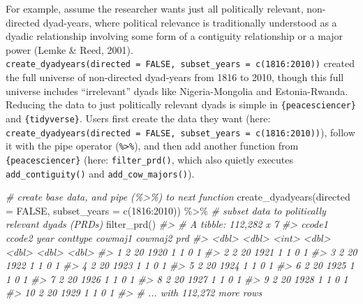 \documentclass[
  11pt,
]{article}
\newenvironment{Shaded}{\begin{snugshade}}{\end{snugshade}}
\newcommand{\AttributeTok}[1]{\textcolor[rgb]{0.77,0.63,0.00}{#1}}
\newcommand{\CommentTok}[1]{\textcolor[rgb]{0.56,0.35,0.01}{\textit{#1}}}
\newcommand{\ConstantTok}[1]{\textcolor[rgb]{0.00,0.00,0.00}{#1}}
\newcommand{\DecValTok}[1]{\textcolor[rgb]{0.00,0.00,0.81}{#1}}
\newcommand{\FunctionTok}[1]{\textcolor[rgb]{0.00,0.00,0.00}{#1}}
\newcommand{\NormalTok}[1]{#1}
\newcommand{\SpecialCharTok}[1]{\textcolor[rgb]{0.00,0.00,0.00}{#1}}
\begin{document}
For example, assume the researcher wants just all politically relevant, non-directed dyad-years, where political relevance is traditionally understood as a dyadic relationship involving some form of a contiguity relationship or a major power (Lemke \& Reed, 2001). \texttt{create\_dyadyears(directed\ =\ FALSE,\ subset\_years\ =\ c(1816:2010))} created the full universe of non-directed dyad-years from 1816 to 2010, though this full universe includes ``irrelevant'' dyads like Nigeria-Mongolia and Estonia-Rwanda. Reducing the data to just politically relevant dyads is simple in \texttt{\{peacesciencer\}} and \texttt{\{tidyverse\}}. Users first create the data they want (here: \texttt{create\_dyadyears(directed\ =\ FALSE,\ subset\_years\ =\ c(1816:2010))}), follow it with the pipe operator (\texttt{\%\textgreater{}\%}), and then add another function from \texttt{\{peacesciencer\}} (here: \texttt{filter\_prd()}, which also quietly executes \texttt{add\_contiguity()} and \texttt{add\_cow\_majors()}).

\begin{Shaded}
\begin{Highlighting}[]
\CommentTok{\# create base data, and pipe (\%\textgreater{}\%) to next function}
\FunctionTok{create\_dyadyears}\NormalTok{(}\AttributeTok{directed =} \ConstantTok{FALSE}\NormalTok{, }\AttributeTok{subset\_years =} \FunctionTok{c}\NormalTok{(}\DecValTok{1816}\SpecialCharTok{:}\DecValTok{2010}\NormalTok{)) }\SpecialCharTok{\%\textgreater{}\%}
  \CommentTok{\# subset data to politically relevant dyads (PRDs)}
  \FunctionTok{filter\_prd}\NormalTok{()}
\CommentTok{\#\textgreater{} \# A tibble: 112,282 x 7}
\CommentTok{\#\textgreater{}    ccode1 ccode2  year conttype cowmaj1 cowmaj2   prd}
\CommentTok{\#\textgreater{}     \textless{}dbl\textgreater{}  \textless{}dbl\textgreater{} \textless{}int\textgreater{}    \textless{}dbl\textgreater{}   \textless{}dbl\textgreater{}   \textless{}dbl\textgreater{} \textless{}dbl\textgreater{}}
\CommentTok{\#\textgreater{}  1      2     20  1920        1       1       0     1}
\CommentTok{\#\textgreater{}  2      2     20  1921        1       1       0     1}
\CommentTok{\#\textgreater{}  3      2     20  1922        1       1       0     1}
\CommentTok{\#\textgreater{}  4      2     20  1923        1       1       0     1}
\CommentTok{\#\textgreater{}  5      2     20  1924        1       1       0     1}
\CommentTok{\#\textgreater{}  6      2     20  1925        1       1       0     1}
\CommentTok{\#\textgreater{}  7      2     20  1926        1       1       0     1}
\CommentTok{\#\textgreater{}  8      2     20  1927        1       1       0     1}
\CommentTok{\#\textgreater{}  9      2     20  1928        1       1       0     1}
\CommentTok{\#\textgreater{} 10      2     20  1929        1       1       0     1}
\CommentTok{\#\textgreater{} \# ... with 112,272 more rows}
\end{Highlighting}
\end{Shaded}
\end{document}
